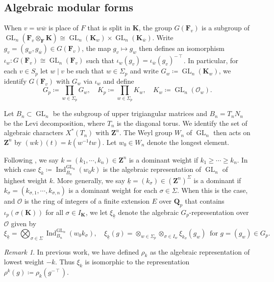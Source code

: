 \documentclass[leqno]{amsart}
\newcommand{\wt}[1]{\underline{ #1 }}
\newcommand{\bw}{\overline{w}}
\DeclareMathOperator{\GL}{GL}
\newcommand{\Z}{{\mathbf{Z}}}
\newcommand{\Qp}{\mathbf{Q}_p}
\newcommand{\F}{{\mathbf{F}}} %
\newcommand{\K}{{\mathbf{K}}} %
\newcommand{\oo}{\mathcal{O}} %
\DeclareMathOperator{\Ind}{Ind}
\theoremstyle{definition}
\theoremstyle{remark}
\newtheorem{rem}[thm]{Remark}
\begin{document}
\subsection{Algebraic modular forms}

When $v=w\bw$ is place of $F$ that is split in $\K$,
the group $G(\F_v)$ is a subgroup 
of  $\GL_n(\F_v\otimes_\F\K)\cong \GL_n(\K_w)\times\GL_n(\K_{\bw})$.
Write $g_v=(g_w,g_{\bw})\in G(\F_v)$,
the map $g_v\mapsto g_w$ then defines an isomorphism
$\iota_w\colon G(\F_v)\cong \GL_n(\F_v)$
such that 
$\iota_w(g_v)=\iota_{\bw}(g_v)^{-\intercal}$.
In particular,
for each $v\in S_p$
let  $w\mid v$ be such that  $w\in \Sigma_p$
and write $G_{w}\coloneqq\GL_n(\K_w)$,
we identify $G(\F_v)$ with $G_w$ 
via $\iota_w$ and define 
\[
	G_p\coloneqq\prod_{w\in \Sigma_p}G_w,\quad
	K_p\coloneqq\prod_{w\in \Sigma_p}K_w,\quad
	K_w\coloneqq\GL_n(\oo_w).
\]

Let $B_n\subset \GL_n$ be the subgroup of
upper trigiangular matrices
and $B_n=T_nN_n$ be the Levi decomposition,
where $T_n$ is the diagonal torus.
We identify the set of algebraic characters $X^*(T_n)$
with  $\Z^n$.
The Weyl group $W_n$ of $\GL_n$
then acts on  $\Z^n$ by
$(wk)(t)=k(w^{-1}tw)$.
Let $w_0\in W_n$ denote the longest element.

Following \cite[Def 2.3]{ger},
we say  $k=(k_1,\cdots,k_n)\in \Z^n$
is a dominant weight if $k_1\geq \cdots\geq k_n$.
In which case
$\xi_k\coloneqq \Ind_{B_n}^{\GL_n}(w_0k)$
is the algebraic representation 
of $\GL_n$ of highest weight $k$.
More generally,
we say $\wt{k}=(k_\sigma)\in (\Z^n)^{\Sigma}$
is a dominant 
if $k_\sigma=(k_{\sigma,1},\cdots,k_{\sigma,n})$
is a dominant weight for each $\sigma\in \Sigma$.
When this is the case,
and $\oo$ is the ring of integers  
of a finite extension $E$ over  $\Qp$
that contains $\iota_p(\sigma(\K))$
for all  $\sigma\in I_\K$,
we let $\xi_{\wt{k}}$ denote 
the algebraic $G_p$-representation over $\oo$ given by
\begin{equation}\label{def:algrep}
	\xi_{\wt{k}}=\bigotimes_{\sigma\in \Sigma}
	\Ind_{B_n}^{\GL_n}(w_0k_{\sigma}),\quad
	\xi_{\wt{k}}(g)=
	\otimes_{w\in \Sigma_p}
	\otimes_{\sigma\in I_w}\xi_{k_\sigma}(g_w)\,
	\text{ for } g=(g_w)\in G_p.
\end{equation}

\begin{rem}
	In previous work, 
	we have defined $\rho_k$ as the 
	algebraic representation of lowest weight  $-k$.
	Thus $\xi_k$ is isomorphic to the representation 
	$\rho^k(g)\coloneqq \rho_k(g^{-\intercal})$.
\end{rem}
\end{document}

